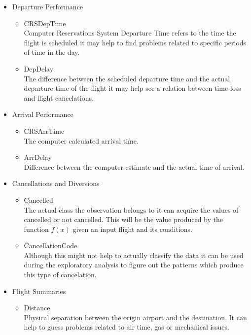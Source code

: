 \documentclass{article}
\begin{document}
\begin{itemize}
\begin{itemize}
        \end{itemize}
        \item Departure Performance
        \begin{itemize}
            \item CRSDepTime\\
                Computer Reservations System Departure Time refers to the time the
                flight is scheduled it may help to find problems related to specific
                 periods of time in the day.
            \item DepDelay\\
                The difference between the scheduled departure time and the actual
                 departure time of the flight it may help see a relation between
                 time loss and flight cancelations.
        \end{itemize}
        \item Arrival Performance
        \begin{itemize}
            \item CRSArrTime\\
                The computer calculated arrival time.
            \item ArrDelay\\
                Difference between the computer estimate and the actual time of
                arrival.
        \end{itemize}
        \item Cancellations and Diversions
        \begin{itemize}
            \item Cancelled\\
                The actual class the observation belongs to it can acquire
                the values of cancelled or not cancelled. This will be the value
                produced by the function $f(x)$ given an input flight and its
                conditions.
            \item CancellationCode\\
                Although this might not help to actually classify the data
                it can be used during the exploratory analysis to figure out
                the patterns which produce this type of cancelation.
        \end{itemize}
        \item Flight Summaries
        \begin{itemize}
            \item Distance\\
                Physical separation between the origin airport and the
                destination. It can help to guess problems related to air
                time, gas or mechanical issues.
        \end{itemize}
    \end{itemize}
\end{document}
